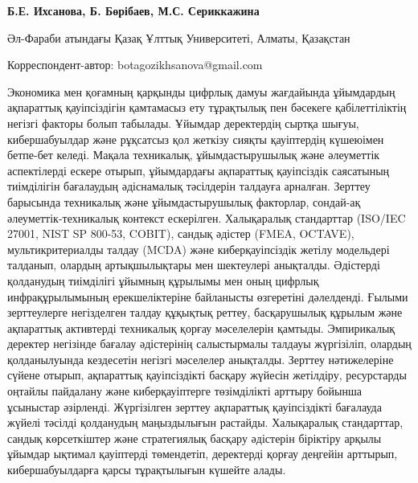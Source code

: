 
\begin{articleheader}

{\bfseries
Б.Е. Ихсанова\textsuperscript{\envelope },
Б. Бөрібаев,
М.С. Сериккажина
}
\end{articleheader}

\begin{affiliation}
Әл-Фараби атындағы Қазақ Ұлттық Университеті, Алматы, Қазақстан

\raggedright \textsuperscript{\envelope }Корреспондент-автор: botagozikhsanova@gmail.com
\end{affiliation}

Экономика мен қоғамның қарқынды цифрлық дамуы жағдайында ұйымдардың
ақпараттық қауіпсіздігін қамтамасыз ету тұрақтылық пен бәсекеге
қабілеттіліктің негізгі факторы болып табылады. Ұйымдар деректердің
сыртқа шығуы, кибершабуылдар және рұқсатсыз қол жеткізу сияқты
қауіптердің күшеюімен бетпе-бет келеді. Мақала техникалық,
ұйымдастырушылық және әлеуметтік аспектілерді ескере отырып, ұйымдардағы
ақпараттық қауіпсіздік саясатының тиімділігін бағалаудың әдіснамалық
тәсілдерін талдауға арналған. Зерттеу барысында техникалық және
ұйымдастырушылық факторлар, сондай-ақ әлеуметтік-техникалық контекст
ескерілген. Халықаралық стандарттар (ISO/IEC 27001, NIST SP 800-53,
COBIT), сандық әдістер (FMEA, OCTAVE), мультикритериалды талдау (MCDA)
және киберқауіпсіздік жетілу модельдері талданып, олардың артықшылықтары
мен шектеулері анықталды. Әдістерді қолданудың тиімділігі ұйымның
құрылымы мен оның цифрлық инфрақұрылымының ерекшеліктеріне байланысты
өзгеретіні дәлелденді. Ғылыми зерттеулерге негізделген талдау құқықтық
реттеу, басқарушылық құрылым және ақпараттық активтерді техникалық
қорғау мәселелерін қамтыды. Эмпирикалық деректер негізінде бағалау
әдістерінің салыстырмалы талдауы жүргізіліп, олардың қолданылуында
кездесетін негізгі мәселелер анықталды. Зерттеу нәтижелеріне сүйене
отырып, ақпараттық қауіпсіздікті басқару жүйесін жетілдіру, ресурстарды
оңтайлы пайдалану және киберқауіптерге төзімділікті арттыру бойынша
ұсыныстар әзірленді. Жүргізілген зерттеу ақпараттық қауіпсіздікті
бағалауда жүйелі тәсілді қолданудың маңыздылығын растайды. Халықаралық
стандарттар, сандық көрсеткіштер және стратегиялық басқару әдістерін
біріктіру арқылы ұйымдар ықтимал қауіптерді төмендетіп, деректерді
қорғау деңгейін арттырып, кибершабуылдарға қарсы тұрақтылығын күшейте
алады.

